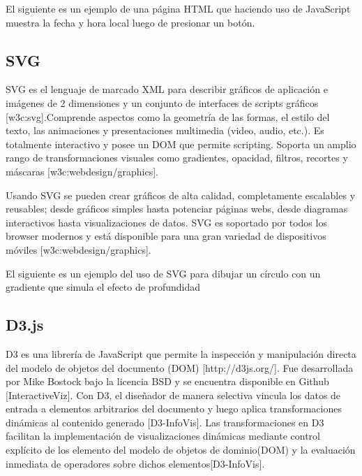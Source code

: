 El siguiente es un ejemplo de una página HTML que haciendo uso de JavaScript muestra la fecha y hora local luego de presionar un botón.



\subsection{SVG}

SVG es el lenguaje de marcado XML para describir gráficos de aplicación e imágenes de 2 dimensiones y un conjunto de interfaces de scripts gráficos [w3c:svg].Comprende aspectos como la geometría de las formas, el estilo del texto, las animaciones y presentaciones multimedia (video, audio, etc.). Es totalmente interactivo y posee un DOM que permite scripting. Soporta un amplio rango de transformaciones visuales como gradientes, opacidad, filtros, recortes y máscaras [w3c:webdesign/graphics]. 

Usando SVG se pueden crear gráficos de alta calidad, completamente escalables y reusables; desde gráficos simples hasta potenciar páginas webs, desde diagramas interactivos hasta visualizaciones de datos. SVG es soportado por todos los browser modernos y está disponible para una gran variedad de dispositivos móviles [w3c:webdesign/graphics].

El siguiente es un ejemplo del uso de SVG para dibujar un círculo con un gradiente que simula el efecto de profundidad


\subsection{D3.js}

D3 es una librería de JavaScript que permite la inspección y manipulación directa del modelo de objetos del documento (DOM) [http://d3js.org/]. Fue desarrollada por Mike Bostock bajo la licencia BSD y se encuentra disponible en Github [InteractiveViz]. Con D3, el diseñador de manera selectiva vincula los datos de entrada a elementos arbitrarios del documento y luego aplica transformaciones dinámicas al contenido generado [D3-InfoVis]. Las transformaciones en D3 facilitan la implementación de visualizaciones dinámicas mediante control explícito de los elemento del modelo de objetos de dominio(DOM) y la evaluación inmediata de operadores sobre dichos elementos[D3-InfoVis].

